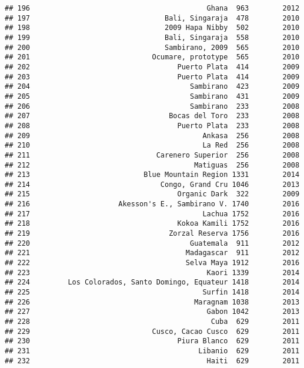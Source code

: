 \documentclass[
]{article}
\begin{document}
\begin{verbatim}
## 196                                          Ghana  963        2012
## 197                                Bali, Singaraja  478        2010
## 198                                2009 Hapa Nibby  502        2010
## 199                                Bali, Singaraja  558        2010
## 200                                Sambirano, 2009  565        2010
## 201                             Ocumare, prototype  565        2010
## 202                                   Puerto Plata  414        2009
## 203                                   Puerto Plata  414        2009
## 204                                      Sambirano  423        2009
## 205                                      Sambirano  431        2009
## 206                                      Sambirano  233        2008
## 207                                 Bocas del Toro  233        2008
## 208                                   Puerto Plata  233        2008
## 209                                         Ankasa  256        2008
## 210                                         La Red  256        2008
## 211                              Carenero Superior  256        2008
## 212                                       Matiguas  256        2008
## 213                           Blue Mountain Region 1331        2014
## 214                               Congo, Grand Cru 1046        2013
## 215                                   Organic Dark  322        2009
## 216                     Akesson's E., Sambirano V. 1740        2016
## 217                                         Lachua 1752        2016
## 218                                   Kokoa Kamili 1752        2016
## 219                                 Zorzal Reserva 1756        2016
## 220                                      Guatemala  911        2012
## 221                                     Madagascar  911        2012
## 222                                     Selva Maya 1912        2016
## 223                                          Kaori 1339        2014
## 224         Los Colorados, Santo Domingo, Equateur 1418        2014
## 225                                         Surfin 1418        2014
## 226                                       Maragnam 1038        2013
## 227                                          Gabon 1042        2013
## 228                                           Cuba  629        2011
## 229                             Cusco, Cacao Cusco  629        2011
## 230                                   Piura Blanco  629        2011
## 231                                        Libanio  629        2011
## 232                                          Haiti  629        2011

\end{verbatim}
\end{document}
